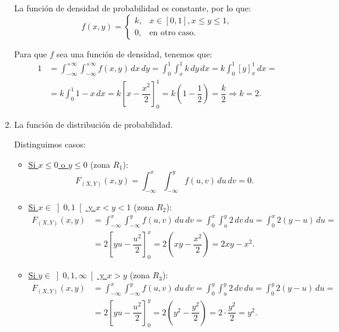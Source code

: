 \begin{ejercicio}
\begin{enumerate}
        La función de densidad de probabilidad es constante, por lo que:
        \begin{equation*}
            f(x, y) = \begin{cases}
                k, & x\in [0,1], x\leq y\leq 1, \\
                0, & \text{en otro caso}.
            \end{cases}
        \end{equation*}

        Para que $f$ sea una función de densidad, tenemos que:
        \begin{align*}
            1&=\int_{-\infty}^{+\infty} \int_{-\infty}^{+\infty} f(x, y) \, dx \, dy = \int_{0}^{1} \int_{x}^{1} k \, dy \, dx = k\int_{0}^{1} \left[y\right]_{x}^{1} \, dx =\\&= k\int_{0}^{1} 1-x \, dx = k\left[x-\dfrac{x^2}{2}\right]_0^1 = k\left(1-\dfrac{1}{2}\right) = \dfrac{k}{2} \Longrightarrow k=2.
        \end{align*}
        \item La función de distribución de probabilidad.
        
        Distinguimos casos:
        \begin{itemize}
            \item \ul{Si $x\leq 0$ \quad o \quad $y\leq 0$} (zona $R_1$):
            \begin{equation*}
                F_{(X,Y)}(x, y) = \int_{-\infty}^x \int_{-\infty}^y f(u, v) \, du \, dv = 0.
            \end{equation*}

            \item \ul{Si $x\in \left]0,1\right[$ \quad y \quad $x<y<1$} (zona $R_2$):
            \begin{align*}
                F_{(X,Y)}(x, y) &= \int_{-\infty}^x \int_{-\infty}^y f(u, v) \, du \, dv = \int_{0}^x \int_{u}^y 2 \, dv \, du = \int_{0}^x 2(y-u) \, du
                =\\&= 2\left[yu-\dfrac{u^2}{2}\right]_0^x = 2\left(xy-\dfrac{x^2}{2}\right) = 2xy-x^2.
            \end{align*}

            \item \ul{Si $y\in \left]0,1,\infty\right[$ \quad y \quad $x>y$} (zona $R_3$):
            \begin{align*}
                F_{(X,Y)}(x, y) &= \int_{-\infty}^x \int_{-\infty}^y f(u, v) \, du \, dv = \int_{0}^{y} \int_{u}^{y} 2 \, dv \, du = \int_{0}^{y} 2(y-u) \, du
                =\\&= 2\left[yu-\dfrac{u^2}{2}\right]_0^y = 2\left(y^2-\dfrac{y^2}{2}\right) = 2\cdot \dfrac{y^2}{2} = y^2.
            \end{align*}


\end{itemize}
\end{enumerate}
\end{ejercicio}
